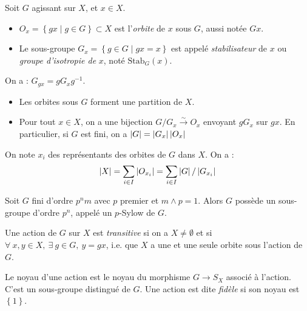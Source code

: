 \documentclass{cours}
\begin{document}
\begin{definition}
    Soit $G$ agissant sur $X$, et $x \in X$.
    \begin{itemize}
        \item $O_{x} = \left\{gx \mid g \in G\right\} \subset X$ est l'\emph{orbite} de $x$ sous $G$, aussi notée $Gx$.
        \item Le sous-groupe $G_{x} = \left\{g \in G \mid gx = x\right\}$ est appelé \emph{stabilisateur} de $x$ ou \emph{groupe d'isotropie de} $x$, noté $\text{Stab}_{G}(x)$.
    \end{itemize}
\end{definition}

\begin{lemma}
    On a : $G_{gx} = gG_{x}g^{-1}$.
\end{lemma}

\begin{proposition}
    \begin{itemize}
        \item Les orbites sous $G$ forment une partition de $X$.
        \item Pour tout $x \in X$, on a une bijection $G/G_{x} \xrightarrow{\sim} O_{x}$ envoyant $gG_{x}$ sur $gx$. En particulier, si $G$ est fini, on a $\left|G\right| = \left|G_{x}\right|\left|O_{x}\right|$
    \end{itemize}
\end{proposition}

\begin{corollary}
    On note $x_{i}$ des représentants des orbites de $G$ dans $X$. On a :
    \[
        \left|X\right| = \sum_{i\in I} \left|O_{x_{i}}\right| = \sum_{i\in I} \left|G\right|/\left|G_{x_{i}}\right|
    \]
\end{corollary}

\begin{theorem}
    Soit $G$ fini d'ordre $p^{n}m$ avec $p$ premier et $m \wedge p = 1$. Alors $G$ possède un sous-groupe d'ordre $p^{n}$, appelé un $p$-Sylow de $G$.
\end{theorem}

\begin{definition}
    Une action de $G$ sur $X$ est \emph{transitive} si on a $X \neq \emptyset$ et si $\forall\ x, y \in X,\ \exists \ g \in G, \ y = gx$, i.e. que $X$ a une et une seule orbite sous l'action de $G$.
\end{definition}

\begin{definition}
    Le noyau d'une action est le noyau du morphisme $G \rightarrow S_{X}$ associé à l'action. C'est un sous-groupe distingué de $G$. Une action est dite \emph{fidèle} si son noyau est $\left\{1\right\}$.
\end{definition}
\end{document}
